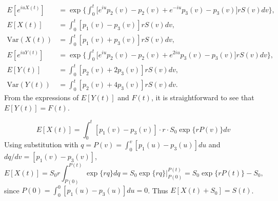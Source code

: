 \documentclass[12pt]{article}
\begin{document}
\begin{equation}
\begin{split}
E[e^{iuX(t)}] &= \exp \Big\{ \int_0^t \Big[ e^{iu}p_2(v)-p_2(v) + e^{-iu}p_3(v) - p_3(v) \Big] r S(v) dv\Big\},\\
E[X(t)] &= \int_0^t [p_1(v) - p_3(v)] r S(v) dv,\\
\text{Var}(X(t)) &= \int_0^t [p_1(v) + p_3(v)] r S(v) dv, \\
E[e^{iuY(t)}] &= \exp \Big\{ \int_0^t \Big[ e^{iu}p_2(v)-p_2(v) + e^{2iu}p_3(v) - p_3(v) \Big] r S(v) dv\Big\},\\
E[Y(t)] &= \int_0^t [p_2(v) + 2p_3(v)] r S(v) dv,\\
\text{Var}(Y(t)) &= \int_0^t [p_2(v) + 4p_3(v)] r S(v) dv.
\end{split}
\end{equation}
From the expressions of $E[Y(t)]$ and $F(t)$, it is straightforward to see that $E[Y(t)] = F(t)$. 

\begin{equation}
E[X(t)] = \int_0^t [p_1(v) - p_3(v)] \cdot r \cdot S_0 \exp \Big\{ r P(v) \Big\} dv
\end{equation}
Using substitution with $q = P(v) = \int_0^v [p_1(u) - p_3(u)] du$ and $dq/dv = [p_1(v) - p_3(v)]$,
\begin{equation}
E[X(t)] = S_0 r \int_{P(0)}^{P(t)} \exp\{rq\}dq = S_0 \exp \{rq\} \Big \vert_{P(0)}^{P(t)} = S_0 \exp\{r P(t)\} - S_0,
\end{equation}
since $P(0) = \int_0^0 [p_1(u) - p_3(u)]du = 0$. Thus $E[X(t) + S_0] = S(t)$.
\end{document}
